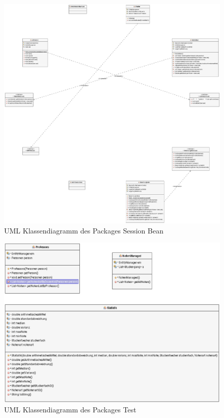 \documentclass[12pt,a4paper,parskip]{scrreprt}
\begin{document}
\begin{figure}[h]
	\centering
	\includegraphics[width=1\linewidth]{Diagramme/generated/package_sessionBean}
	\caption[Package Session Bean]{UML Klassendiagramm des Packages \glqq Session Bean\grqq}
	\label{fig:package_session_bean}
\end{figure}
\begin{figure}[h]
	\centering
	\includegraphics[width=1\linewidth]{Diagramme/generated/package_test}
	\caption[Package Test]{UML Klassendiagramm des Packages \glqq Test\grqq}
	\label{fig:package_test}
\end{figure}
\listoffigures
\end{document}
